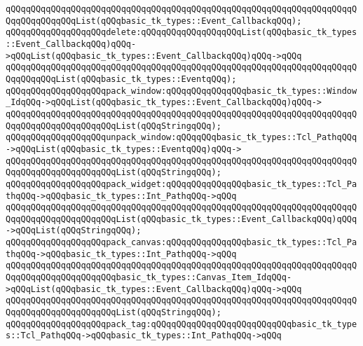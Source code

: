 \verb|qQQqqQQqqQQqqQQqqQQqqQQqqQQqqQQqqQQqqQQqqQQqqQQqqQQqqQQqqQQqqQQqqQQqqQQqqQQqqQQqqQQqList(qQQqbasic_tk_types::Event_CallbackqQQq);|\newline
\newline
\verb|qQQqqQQqqQQqqQQqqQQqdelete:qQQqqQQqqQQqqQQqqQQqList(qQQqbasic_tk_types::Event_CallbackqQQq)qQQq->qQQqList(qQQqbasic_tk_types::Event_CallbackqQQq)qQQq->qQQq|\newline
\verb|qQQqqQQqqQQqqQQqqQQqqQQqqQQqqQQqqQQqqQQqqQQqqQQqqQQqqQQqqQQqqQQqqQQqqQQqqQQqqQQqList(qQQqbasic_tk_types::EventqQQq);|\newline
\newline
\verb|qQQqqQQqqQQqqQQqqQQqpack_window:qQQqqQQqqQQqqQQqbasic_tk_types::Window_IdqQQq->qQQqList(qQQqbasic_tk_types::Event_CallbackqQQq)qQQq->|\newline
\verb|qQQqqQQqqQQqqQQqqQQqqQQqqQQqqQQqqQQqqQQqqQQqqQQqqQQqqQQqqQQqqQQqqQQqqQQqqQQqqQQqqQQqqQQqqQQqList(qQQqStringqQQq);|\newline
\newline
\verb|qQQqqQQqqQQqqQQqqQQqunpack_window:qQQqqQQqbasic_tk_types::Tcl_PathqQQq->qQQqList(qQQqbasic_tk_types::EventqQQq)qQQq->|\newline
\verb|qQQqqQQqqQQqqQQqqQQqqQQqqQQqqQQqqQQqqQQqqQQqqQQqqQQqqQQqqQQqqQQqqQQqqQQqqQQqqQQqqQQqqQQqqQQqList(qQQqStringqQQq);|\newline
\newline
\verb|qQQqqQQqqQQqqQQqqQQqpack_widget:qQQqqQQqqQQqqQQqbasic_tk_types::Tcl_PathqQQq->qQQqbasic_tk_types::Int_PathqQQq->qQQq|\newline
\verb|qQQqqQQqqQQqqQQqqQQqqQQqqQQqqQQqqQQqqQQqqQQqqQQqqQQqqQQqqQQqqQQqqQQqqQQqqQQqqQQqqQQqqQQqqQQqList(qQQqbasic_tk_types::Event_CallbackqQQq)qQQq->qQQqList(qQQqStringqQQq);|\newline
\newline
\verb|qQQqqQQqqQQqqQQqqQQqpack_canvas:qQQqqQQqqQQqqQQqbasic_tk_types::Tcl_PathqQQq->qQQqbasic_tk_types::Int_PathqQQq->qQQq|\newline
\verb|qQQqqQQqqQQqqQQqqQQqqQQqqQQqqQQqqQQqqQQqqQQqqQQqqQQqqQQqqQQqqQQqqQQqqQQqqQQqqQQqqQQqqQQqqQQqbasic_tk_types::Canvas_Item_IdqQQq->qQQqList(qQQqbasic_tk_types::Event_CallbackqQQq)qQQq->qQQq|\newline
\verb|qQQqqQQqqQQqqQQqqQQqqQQqqQQqqQQqqQQqqQQqqQQqqQQqqQQqqQQqqQQqqQQqqQQqqQQqqQQqqQQqqQQqqQQqqQQqList(qQQqStringqQQq);|\newline
\newline
\verb|qQQqqQQqqQQqqQQqqQQqpack_tag:qQQqqQQqqQQqqQQqqQQqqQQqqQQqbasic_tk_types::Tcl_PathqQQq->qQQqbasic_tk_types::Int_PathqQQq->qQQq|\newline
